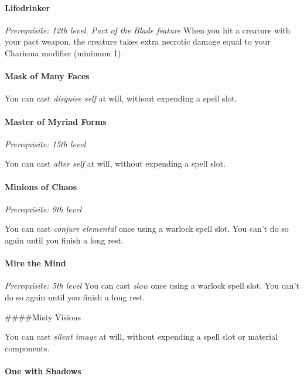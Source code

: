 \documentclass[
]{article}
\begin{document}
\hypertarget{lifedrinker}{%
\paragraph{Lifedrinker}\label{lifedrinker}}

\emph{Prerequisite: 12th level, Pact of the Blade feature} When you hit
a creature with your pact weapon, the creature takes extra necrotic
damage equal to your Charisma modifier (minimum 1).

\hypertarget{mask-of-many-faces}{%
\paragraph{Mask of Many Faces}\label{mask-of-many-faces}}

You can cast \emph{disguise self} at will, without expending a spell
slot.

\hypertarget{master-of-myriad-forms}{%
\paragraph{Master of Myriad Forms}\label{master-of-myriad-forms}}

\emph{Prerequisite: 15th level}

You can cast \emph{alter self} at will, without expending a spell slot.

\hypertarget{minions-of-chaos}{%
\paragraph{Minions of Chaos}\label{minions-of-chaos}}

\emph{Prerequisite: 9th level}

You can cast \emph{conjure elemental} once using a warlock spell slot.
You can't do so again until you finish a long rest.

\hypertarget{mire-the-mind}{%
\paragraph{Mire the Mind}\label{mire-the-mind}}

\emph{Prerequisite: 5th level} You can cast \emph{slow} once using a
warlock spell slot. You can't do so again until you finish a long rest.

\#\#\#\#Misty Visions

You can cast \emph{silent image} at will, without expending a spell slot
or material components.

\hypertarget{one-with-shadows}{%
\paragraph{One with Shadows}\label{one-with-shadows}}
\end{document}
